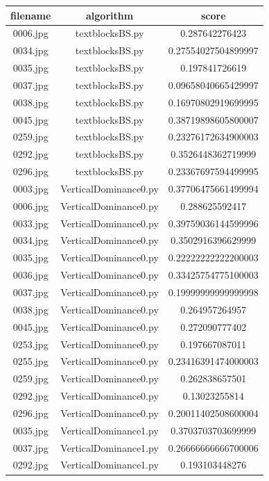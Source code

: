 \documentclass[a4paper,10pt]{article}
\begin{document}
				\begin{table}[htbp]
				\centering
				\begin{tabular}{|c|c|c|}
				\hline
				filename&algorithm&score\\
				\hline
				0006.jpg&textblocksBS.py&0.287642276423\\
0034.jpg&textblocksBS.py&0.27554027504899997\\
0035.jpg&textblocksBS.py&0.197841726619\\
0037.jpg&textblocksBS.py&0.09658040665429997\\
0038.jpg&textblocksBS.py&0.16970802919699995\\
0045.jpg&textblocksBS.py&0.38719898605800007\\
0259.jpg&textblocksBS.py&0.23276172634900003\\
0292.jpg&textblocksBS.py&0.3526448362719999\\
0296.jpg&textblocksBS.py&0.23367697594499995\\
0003.jpg&VerticalDominance0.py&0.37706475661499994\\
0006.jpg&VerticalDominance0.py&0.288625592417\\
0033.jpg&VerticalDominance0.py&0.39759036144599996\\
0034.jpg&VerticalDominance0.py&0.3502916396629999\\
0035.jpg&VerticalDominance0.py&0.22222222222200003\\
0036.jpg&VerticalDominance0.py&0.33425754775100003\\
0037.jpg&VerticalDominance0.py&0.19999999999999998\\
0038.jpg&VerticalDominance0.py&0.264957264957\\
0045.jpg&VerticalDominance0.py&0.272090777402\\
0253.jpg&VerticalDominance0.py&0.197667087011\\
0255.jpg&VerticalDominance0.py&0.23416391474000003\\
0259.jpg&VerticalDominance0.py&0.262838657501\\
0292.jpg&VerticalDominance0.py&0.13023255814\\
0296.jpg&VerticalDominance0.py&0.20011402508600004\\
0035.jpg&VerticalDominance1.py&0.3703703703699999\\
0037.jpg&VerticalDominance1.py&0.26666666666700006\\
0292.jpg&VerticalDominance1.py&0.193103448276\\

				\hline
				\end{tabular}
				\end{table}
				 
\end{document}
